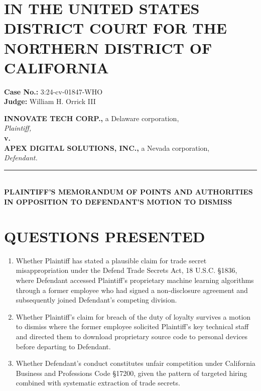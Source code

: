 \documentclass[
    language=english,
    doctype=legal-brief,
    institution=none,
]{../../omnilatex}
\begin{document}
\maketitle

\section*{IN THE UNITED STATES DISTRICT COURT FOR THE NORTHERN DISTRICT OF CALIFORNIA}

\noindent\textbf{Case No.:} 3:24-cv-01847-WHO\\
\textbf{Judge:} William H. Orrick III

\vspace{0.5cm}

\noindent\textbf{INNOVATE TECH CORP.,} a Delaware corporation,\\
\hspace{1.5cm}\textit{Plaintiff,}\\[0.3cm]
\textbf{v.}\\[0.3cm]
\textbf{APEX DIGITAL SOLUTIONS, INC.,} a Nevada corporation,\\
\hspace{1.5cm}\textit{Defendant.}\\[0.5cm]

\noindent\rule{\textwidth}{0.4pt}\\[0.3cm]

\noindent\textbf{PLAINTIFF'S MEMORANDUM OF POINTS AND AUTHORITIES IN OPPOSITION TO DEFENDANT'S MOTION TO DISMISS}

\vspace{0.5cm}

\section{QUESTIONS PRESENTED}

\begin{enumerate}
    \item Whether Plaintiff has stated a plausible claim for trade secret misappropriation under the Defend Trade Secrets Act, 18 U.S.C. \S 1836, where Defendant accessed Plaintiff's proprietary machine learning algorithms through a former employee who had signed a non-disclosure agreement and subsequently joined Defendant's competing division.

    \item Whether Plaintiff's claim for breach of the duty of loyalty survives a motion to dismiss where the former employee solicited Plaintiff's key technical staff and directed them to download proprietary source code to personal devices before departing to Defendant.

    \item Whether Defendant's conduct constitutes unfair competition under California Business and Professions Code \S 17200, given the pattern of targeted hiring combined with systematic extraction of trade secrets.
\end{enumerate}
\end{document}

